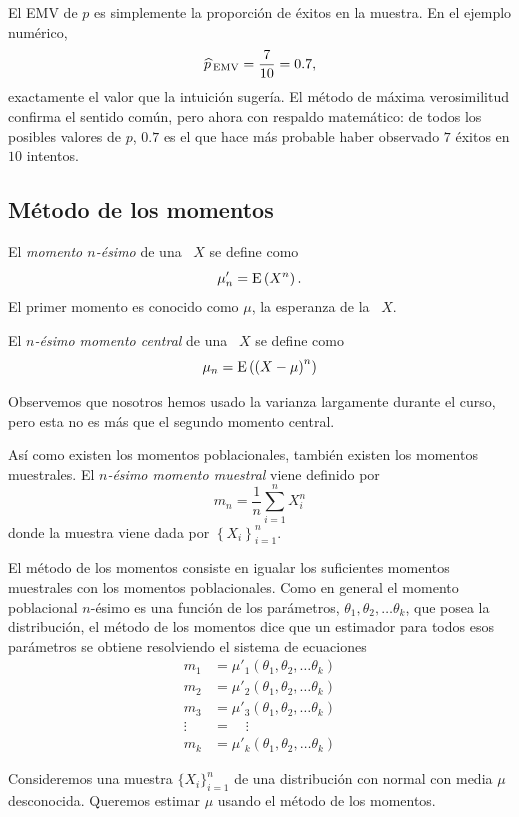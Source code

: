 El EMV de \(p\) es simplemente la proporción de éxitos en la muestra. En el ejemplo numérico, \[\widehat{p}_{\,\text{EMV}} = \frac{7}{10} = \num{0.7},\] exactamente el valor que la intuición sugería. El método de máxima verosimilitud confirma el sentido común, pero ahora con respaldo matemático: de todos los posibles valores de \(p\), \(\num{0.7}\) es el que hace más probable haber observado \(7\) éxitos en \(10\) intentos.

\subsection{Método de los momentos}

\formal

El \emph{momento \(n\)-ésimo} de una \va\ \(X\) se define como \[\mu'_n = \operatorname{E}\left(X^n\right).\]El primer momento es conocido como \(\mu\), la esperanza de la \va\ \(X\). 

El \emph{\(n\)-ésimo momento central} de una \va\ \(X\) se define como \[\mu_n = \operatorname{E}\left(\left( X-\mu \right)^n\right)\]

Observemos que nosotros hemos usado la varianza largamente durante el curso, pero esta no es más que el segundo momento central. 

Así como existen los momentos poblacionales, también existen los momentos muestrales. El \emph{\(n\)-ésimo momento muestral} viene definido por \[m_n = \frac{1}{n}\sum_{i=1}^{n}X_i^n\] donde la muestra viene dada por \(\left\{ X_i \right\}_{i=1}^{n}\).

\informal
El método de los momentos consiste en igualar los suficientes momentos muestrales con los momentos poblacionales. Como en general el momento poblacional \(n\)-ésimo es una función de los parámetros, \(\theta_1, \theta_2, \ldots \theta_k\), que posea la distribución, el método de los momentos dice que un estimador para todos esos parámetros se obtiene resolviendo el sistema de ecuaciones
\begin{align*}
m_1 &= \mu'_1(\theta_1, \theta_2, \ldots \theta_k)\\
m_2 &= \mu'_2(\theta_1, \theta_2, \ldots \theta_k)\\
m_3 &= \mu'_3(\theta_1, \theta_2, \ldots \theta_k)\\
\vdots\quad &=\quad \vdots\\
m_k &= \mu'_k(\theta_1, \theta_2, \ldots \theta_k)
\end{align*}

\example

Consideremos una muestra \(\{X_i\}_{i=1}^n\) de una distribución con normal con media \(\mu\) desconocida. Queremos estimar \(\mu\) usando el método de los momentos.

